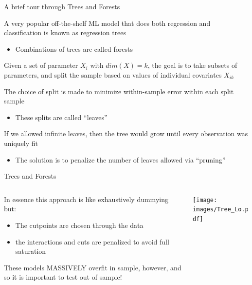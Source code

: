 \documentclass[notes,11pt, aspectratio=169]{beamer}
\newenvironment{wideitemize}{\itemize\addtolength{\itemsep}{10pt}}{\enditemize}
\begin{document}
\begin{frame}{A brief tour through Trees and Forests}
  \begin{wideitemize}
  \item A very popular off-the-shelf ML model that does both regression and classification is known as regression trees
    \begin{itemize}
    \item  Combinations of trees are called forests
    \end{itemize}
  \item Given a set of parameter $X_{i}$ with $dim(X) = k$, the goal
    is to take subsets of parameters, and split the sample based on values of individual covariates $X_{ik}$
  \item The choice of split is made to minimize within-sample error within each split sample
    \begin{itemize}
    \item These splits are called ``leaves''

    \end{itemize}
  \item If we allowed infinite leaves, then the tree would grow until every observation was uniquely fit
    \begin{itemize}
    \item The solution is to penalize the number of leaves allowed via ``pruning''
    \end{itemize}
  \end{wideitemize}
\end{frame}

\begin{frame}{Trees and Forests}
  \begin{columns}[onlytextwidth, T] %
    \begin{column}{.4\textwidth}
      \begin{wideitemize}
      \item In essence this approach is like exhaustively dummying but:
        \begin{itemize}
        \item The cutpoints are chosen through the data
        \item the interactions and cuts are penalized to avoid full
          saturation
        \end{itemize}
      \item These models MASSIVELY overfit in sample, however, and so
        it is important to test out of sample!
      \end{wideitemize}
      \end{column}%
      \hfill%
      \begin{column}{.6\textwidth}
        \texttt{[image: images/Tree\_Lo.pdf]}
      \end{column}%
    \end{columns}
\end{frame}
\end{document}
